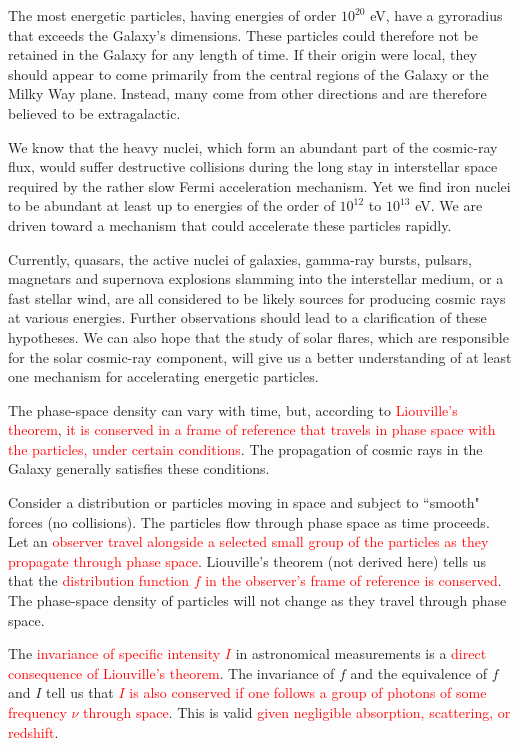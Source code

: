\documentclass[12pt,a4paper]{article}
\newcounter{theo}[section]\setcounter{theo}{0}
\begin{document}
The most energetic particles, having energies of order $10^{20}$ eV, have a gyroradius that exceeds the Galaxy's dimensions. These particles could therefore not be retained in the Galaxy for any length of time. If their origin were local, they should appear to come primarily from the central regions of the Galaxy or the Milky Way plane. Instead, many come from other directions and are therefore believed to be extragalactic.

We know that the heavy nuclei, which form an abundant part of the cosmic-ray flux, would suffer destructive collisions during the long stay in interstellar space required by the rather slow Fermi acceleration mechanism. Yet we find iron nuclei to be abundant at least up to energies of the order of $10^{12}$ to $10^{13}$ eV. We are driven toward a mechanism that could accelerate these particles rapidly.

Currently, quasars, the active nuclei of galaxies, gamma-ray bursts, pulsars, magnetars and supernova explosions slamming into the interstellar medium, or a fast stellar wind, are all considered to be likely sources for producing cosmic rays at various energies. Further observations should lead to a clarification of these hypotheses. We can also hope that the study of solar flares, which are responsible for the solar cosmic-ray component, will give us a better understanding of at least one mechanism for accelerating energetic particles.


\cite{2008aspr.book.....B} The phase-space density can vary with time, but, according to \textcolor{red}{Liouville's theorem}, \textcolor{red}{it is conserved in a frame of reference that travels in phase space with the particles, under certain conditions}. The propagation of cosmic rays in the Galaxy generally satisfies these conditions.

Consider a distribution or particles moving in space and subject to ``smooth" forces (no collisions). The particles flow through phase space as time proceeds. Let an \textcolor{red}{observer travel alongside a selected small group of the particles as they propagate through phase space}. Liouville's theorem (not derived here) tells us that the \textcolor{red}{distribution function $f$ in the observer's frame of reference is conserved}. The phase-space density of particles will not change as they travel through phase space.

The \textcolor{red}{invariance of specific intensity $I$} in astronomical measurements is a \textcolor{red}{direct consequence of Liouville's theorem}. The invariance of $f$ and the equivalence of $f$ and $I$ tell us that \textcolor{red}{$I$ is also conserved if one follows a group of photons of some frequency $\nu$ through space}. This is valid \textcolor{red}{given negligible absorption, scattering, or redshift}.
\end{document}

